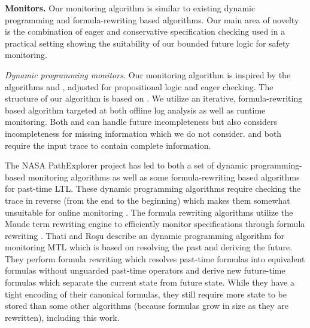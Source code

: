 
\textbf{Monitors.}
Our monitoring algorithm is similar to existing dynamic programming and formula-rewriting based algorithms. 
Our main area of novelty is the combination of eager and conservative specification checking used in a practical setting showing the suitability of our bounded future logic for safety monitoring.

\textit{Dynamic programming monitors.}
Our monitoring algorithm is inspired by the algorithms \greduce \cite{Garg2011} and \precis \cite{Chowdhury2014}, adjusted for propositional logic and eager checking. 
The structure of our algorithm is based on \greduce. 
We utilize an iterative, formula-rewriting based algorithm targeted at both offline log analysis as well as runtime monitoring. 
Both \greduce and \precis can handle future incompleteness but \greduce also considers incompleteness for missing information which we do not consider. 
\precis and \monitor both require the input trace to contain complete information.  


The NASA PathExplorer project has led to both a set of dynamic programming-based monitoring algorithms as well as some formula-rewriting based algorithms \cite{Havelund2004} for past-time LTL. These dynamic programming algorithms require checking the trace in reverse (from the end to the beginning) which makes them somewhat unsuitable for online monitoring \cite{Havelund2002}. The formula rewriting algorithms utilize the Maude term rewriting engine to efficiently monitor specifications through formula rewriting \cite{Rosu2005}. 
%
Thati and Ro\c{s}u \cite{Thati2005} describe an dynamic programming algorithm for monitoring MTL which is based on resolving the past and deriving the future. They perform formula rewriting which resolves past-time formulas into equivalent formulas without unguarded past-time operators and derive new future-time formulas which separate the current state from future state. 
While they have a tight encoding of their canonical formulas, they still require more state to be stored than some other algorithms (because formulas grow in size as they are rewritten), including this work.



